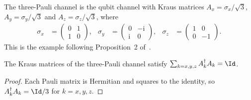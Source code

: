 \begin{definition}
    \label{def:wielandt_three_pauli_channel}
    \leanok
    The three-Pauli channel is the qubit channel with Kraus matrices
    $A_x=\sigma_x/\sqrt3$, $A_y=\sigma_y/\sqrt3$ and
    $A_z=\sigma_z/\sqrt3$, where
    \begin{align}
        \sigma_x & =\begin{pmatrix}0&1\\1&0\end{pmatrix},                  &
        \sigma_y & =\begin{pmatrix}0&-\mathrm i\\\mathrm i&0\end{pmatrix}, &
        \sigma_z & =\begin{pmatrix}1&0\\0&-1\end{pmatrix}.
    \end{align}
    This is the example following Proposition~2 of~\cite{Sanz2010Quantum}.
\end{definition}

\begin{lemma}
    \label{lem:wielandt_three_pauli_trace_preserving}
    \leanok
    The Kraus matrices of the three-Pauli channel satisfy
    $\sum_{k=x,y,z}A_k^\dagger A_k=\Id$.
\end{lemma}
\begin{proof}\leanok
    Each Pauli matrix is Hermitian and squares to the identity, so
    $A_k^\dagger A_k=\Id/3$ for $k=x,y,z$.
\end{proof}

